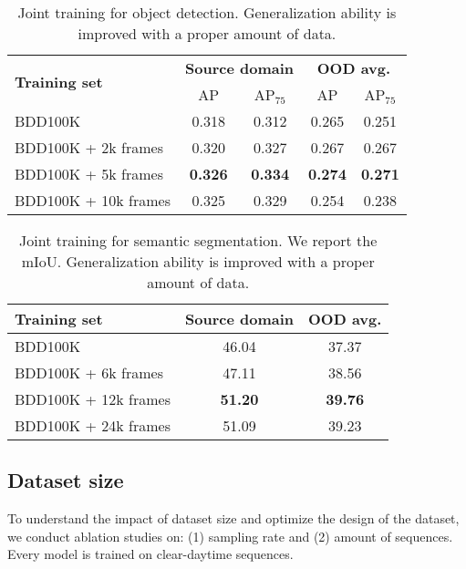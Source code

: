 \begin{table}[h]
\centering
\footnotesize
\setlength{\tabcolsep}{8pt}
\begin{tabular}{lcccc}
\toprule
\multirow{2}{*}{\textbf{Training set}} & \multicolumn{2}{c}{\textbf{Source domain}} & \multicolumn{2}{c}{\textbf{OOD avg.}}    \\ 
\cmidrule(lr){2-3} \cmidrule(lr){4-5}
                            & \multicolumn{1}{c}{AP} & AP$_{75}$ & AP    & AP$_{75}$ \\ \midrule
BDD100K                     & 0.318                  & 0.312     & 0.265 & 0.251     \\
BDD100K + 2k frames  & 0.320                   & 0.327     & 0.267 & 0.267     \\
BDD100K + 5k frames    & \textbf{0.326} & \textbf{0.334} & \textbf{0.274} & \textbf{0.271} \\
BDD100K + 10k frames & 0.325                  & 0.329     & 0.254 & 0.238     \\
\bottomrule
\end{tabular}\caption{Joint training for object detection. Generalization ability is improved with a proper amount of data. \label{tab:det_joint}}
\end{table}
\begin{table}[h]
\centering
\footnotesize
\setlength{\tabcolsep}{8pt}

\begin{tabular}{lcc}
\toprule
 \textbf{Training set}        &  \textbf{Source domain}   & \textbf{OOD avg.} \\ \midrule
BDD100K                     & 46.04   & 37.37                             \\
BDD100K + 6k frames  & 47.11 &  38.56                             \\
BDD100K + 12k frames &
  \textbf{51.20} &
  \textbf{39.76} \\
BDD100K + 24k frames & 51.09 & 39.23   \\
\bottomrule
\end{tabular}\caption{Joint training for semantic segmentation. We report the mIoU. Generalization ability is improved with a proper amount of data. \label{tab:seg_joint}}
\end{table}

\subsection{Dataset size} \label{sec:suppl_exp_dataset_size}
To understand the impact of dataset size and optimize the design of the dataset, we conduct ablation studies on: (1) sampling rate and (2) amount of sequences. 
Every model is trained on clear-daytime sequences.

